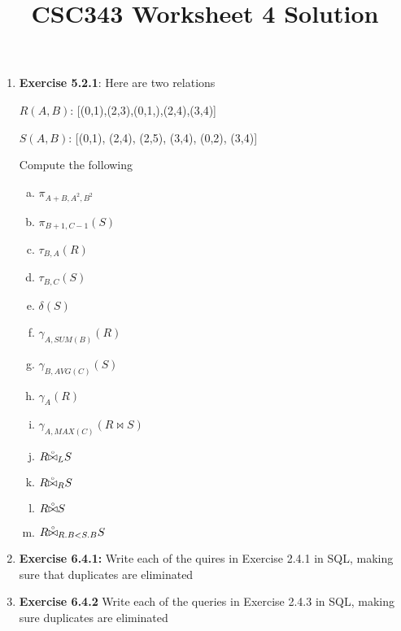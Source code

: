 \documentclass[12pt]{article}
\begin{document}
\title{CSC343 Worksheet 4 Solution}
\maketitle

\bigskip

\begin{enumerate}[1.]
    \item \textbf{Exercise 5.2.1}: Here are two relations

    \bigskip

    $R(A,B)$: [(0,1),(2,3),(0,1,),(2,4),(3,4)]

    \bigskip

    $S(A,B)$: [(0,1), (2,4), (2,5), (3,4), (0,2), (3,4)]

    \bigskip

    Compute the following

    \begin{enumerate}[a)]
        \item $\pi_{A+B,A^2,B^2}$
        \item $\pi_{B+1,C-1}(S)$
        \item $\tau_{B,A}(R)$
        \item $\tau_{B,C}(S)$
        \item $\delta(S)$
        \item $\gamma_{A, SUM(B)}(R)$
        \item $\gamma_{B, AVG(C)}(S)$
        \item $\gamma_A(R)$
        \item $\gamma_{A, MAX(C)}(R \bowtie S)$
        \item $R \accentset{\circ}{\bowtie}_L S$
        \item $R \accentset{\circ}{\bowtie}_R S$
        \item $R \accentset{\circ}{\bowtie} S$
        \item $R \accentset{\circ}{\bowtie}_{R.B < S.B} S$
    \end{enumerate}

    \item \textbf{Exercise 6.4.1:} Write each of the quires in Exercise 2.4.1 in SQL,
    making sure that duplicates are eliminated

    \item \textbf{Exercise 6.4.2} Write each of the queries in Exercise 2.4.3 in
    SQL, making sure duplicates are eliminated

\end{enumerate}
\end{document}
